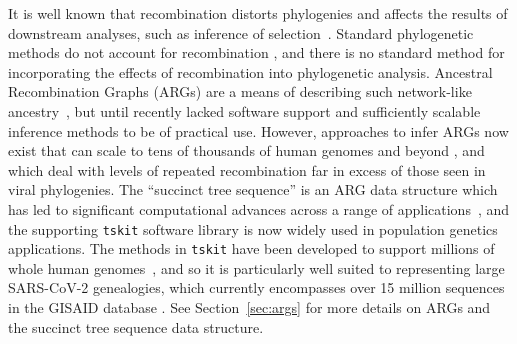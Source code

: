 \documentclass{article}
\begin{document}
It is well known that recombination distorts phylogenies \citep{Schierup2000-fg}
and affects the results of downstream analyses, such as inference of
selection~\citep{Anisimova2003-vr}. Standard phylogenetic methods do
not account for recombination
\citep[e.g.][]{Ronquist2012-zw,Minh2020-lr,Guindon2003-zd}, and there is
no standard method for incorporating the effects of recombination into
phylogenetic analysis.
Ancestral Recombination Graphs (ARGs) are a means of describing such
network-like ancestry~\citep{Griffiths1981-lw,Gusfield2014-qw}, but
until recently lacked software support and sufficiently scalable
inference methods to be of practical use.
However, approaches to infer ARGs now exist that can scale to tens of
thousands of human genomes and beyond
\citep{Speidel2019-yh,Kelleher2019-ba,Schaefer2021-yg,Zhang2023-lf}, and which
deal with levels of repeated recombination far in excess of those seen in viral
phylogenies. The ``succinct tree sequence'' is an ARG data structure
which has led to significant computational advances across a range
of
applications~\citep{Kelleher2016-wk,Kelleher2018-xc,Kelleher2019-ba,Ralph2020-efficiently,
Wohns2022-th}, and the supporting \texttt{tskit} software library
is now widely used in population genetics applications.
The methods in \texttt{tskit} have been developed to support millions of
whole human genomes~\citep{Kelleher2019-ba}, and so it is particularly well suited
to representing large SARS-CoV-2 genealogies,
which currently encompasses over 15 million sequences in the GISAID database
\citep{Shu2017-hp}.
See Section~\ref{sec:args} for more details on ARGs and the succinct
tree sequence data structure.
\end{document}
